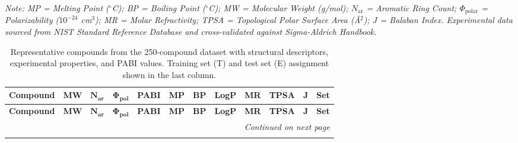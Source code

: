 \documentclass[12pt,a4paper]{article}
\begin{document}
\noindent\textit{Note: MP = Melting Point ($^{\circ}$C); BP = Boiling Point ($^{\circ}$C); MW = Molecular Weight (g/mol); $N_{\text{ar}}$ = Aromatic Ring Count; $\Phi_{\text{polar}}$ = Polarizability ($10^{-24}$ cm$^3$); MR = Molar Refractivity; TPSA = Topological Polar Surface Area (\AA$^2$); $J$ = Balaban Index. Experimental data sourced from NIST Standard Reference Database\cite{nist2024} and cross-validated against Sigma-Aldrich Handbook\cite{aldrich2022handbook}.}

\vspace{0.3cm}

\begin{small}
\begin{longtable}{@{}p{2.8cm}ccccccccccc@{}}
\caption{Representative compounds from the 250-compound dataset with structural descriptors, experimental properties, and PABI values. Training set (T) and test set (E) assignment shown in the last column.}
\label{tab:dataset_full}\\
\toprule
\textbf{Compound} & \textbf{MW} & $\mathbf{N_{\text{ar}}}$ & $\mathbf{\Phi_{\text{pol}}}$ & \textbf{PABI} & \textbf{MP} & \textbf{BP} & \textbf{LogP} & \textbf{MR} & \textbf{TPSA} & $\mathbf{J}$ & \textbf{Set} \\
\midrule
\endfirsthead

\toprule
\textbf{Compound} & \textbf{MW} & $\mathbf{N_{\text{ar}}}$ & $\mathbf{\Phi_{\text{pol}}}$ & \textbf{PABI} & \textbf{MP} & \textbf{BP} & \textbf{LogP} & \textbf{MR} & \textbf{TPSA} & $\mathbf{J}$ & \textbf{Set} \\
\midrule
\endhead

\midrule
\multicolumn{12}{r}{\textit{Continued on next page}} \\
\endfoot

\bottomrule
\endlastfoot


\end{longtable}
\end{small}
\end{document}
